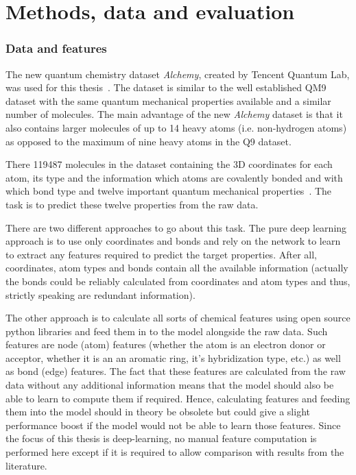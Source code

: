\chapter{Methods, data and evaluation}
\label{chapter:Methods}


\subsection{Data and features}

The new quantum chemistry dataset \textit{Alchemy}, created by Tencent Quantum Lab, was used for this thesis~\cite{Chen2019}. The dataset is similar to the well established QM9 dataset with the same quantum mechanical properties available and a similar number of molecules. The main advantage of the new \textit{Alchemy} dataset is that it also contains larger molecules of up to 14 heavy atoms (i.e. non-hydrogen atoms) as opposed to the maximum of nine heavy atoms in the Q9 dataset.

There 119487 molecules in the dataset containing the 3D coordinates for each atom, its type and the information which atoms are covalently bonded and with which bond type and twelve important quantum mechanical properties~\cite{Chen2019}. The task is to predict these twelve properties from the raw data.

There are two different approaches to go about this task. The pure deep learning approach is to use only coordinates and bonds and rely on the network to learn to extract any features required to predict the target properties. After all, coordinates, atom types and bonds contain all the available information (actually the bonds could be reliably calculated from coordinates and atom types and thus, strictly speaking are redundant information).

The other approach is to calculate all sorts of chemical features using open source python libraries and feed them in to the model alongside the raw data. Such features are node (atom) features (whether the atom is an electron donor or acceptor, whether it is an an aromatic ring, it's hybridization type, etc.) as well as bond (edge) features. The fact that these features are calculated from the raw data without any additional information means that the model should also be able to learn to compute them if required. Hence, calculating features and feeding them into the model should in theory be obsolete but could give a slight performance boost if the model would not be able to learn those features. Since the focus of this thesis is deep-learning, no manual feature computation is performed here except if it is required to allow comparison with results from the literature.

